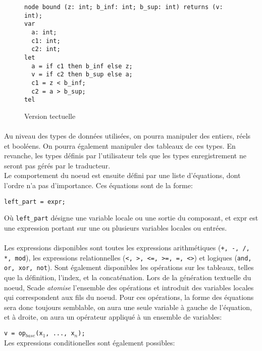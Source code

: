 \begin{figure}[h]
\begin{center}
\begin{verbatim}
node bound (z: int; b_inf: int; b_sup: int) returns (v: int);
var
  a: int;
  c1: int;
  c2: int;
let
  a = if c1 then b_inf else z;
  v = if c2 then b_sup else a;
  c1 = z < b_inf;
  c2 = a > b_sup;
tel
\end{verbatim}
\end{center}
\caption{Version tectuelle}
\end{figure}

\paragraph{}
Au niveau des types de données utilisées, on pourra manipuler
des entiers, réels et booléens. On pourra également manipuler des
tableaux de ces types. En revanche, les types définis par
l'utilisateur tels que les types enregistrement ne seront pas gérés
par le traducteur.\\
Le comportement du noeud est ensuite défini par une liste d'équations,
dont l'ordre n'a pas d'importance. Ces équations sont de la forme:
\begin{verbatim}
left_part = expr;
\end{verbatim}
Où \texttt{left\_part} désigne une variable locale ou une sortie du composant, et expr
est une expression portant sur une ou plusieurs variables locales ou entrées.

\paragraph{}
Les expressions disponibles sont toutes les expressions arithmétiques
(\texttt{+, -, /, *, mod}), les expressions relationnelles (\texttt{<, >, <=, >=, =, <>})
et logiques (\texttt{and, or, xor, not}). Sont également disponibles les opérations sur les tableaux, telles que
la définition, l'index, et la concaténation. Lors de la génération
textuelle du noeud, Scade \emph{atomise} l'ensemble des opérations et
introduit des variables locales qui correspondent aux fils du
noeud. Pour ces opérations, la forme des équations sera donc toujours
semblable, on aura une seule variable à gauche de l'équation, et à
droite, on aura un opérateur appliqué à un ensemble de variables:

\texttt{v = op$_{base}$(x$_1$, ..., x$_n$);}\\
Les expressions conditionelles sont également possibles:


